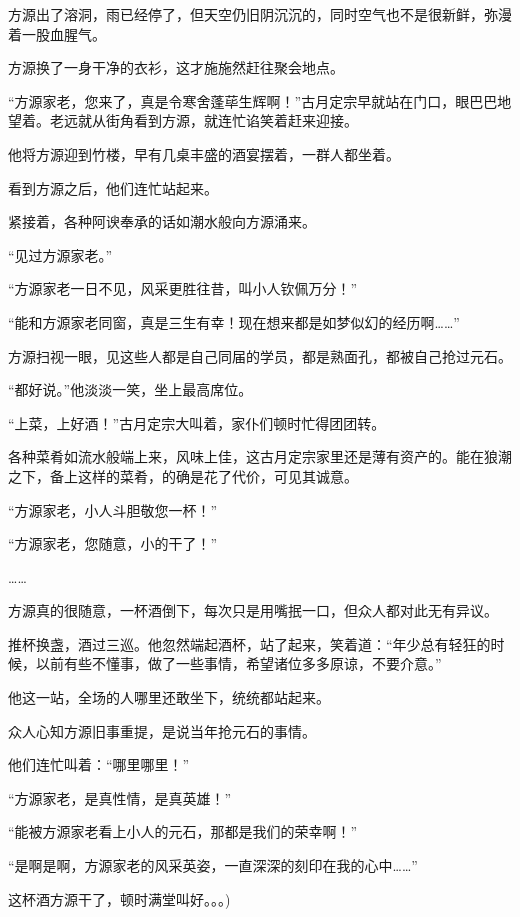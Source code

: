 \begin{this_body}
方源出了溶洞，雨已经停了，但天空仍旧阴沉沉的，同时空气也不是很新鲜，弥漫着一股血腥气。

方源换了一身干净的衣衫，这才施施然赶往聚会地点。

“方源家老，您来了，真是令寒舍蓬荜生辉啊！”古月定宗早就站在门口，眼巴巴地望着。老远就从街角看到方源，就连忙谄笑着赶来迎接。

他将方源迎到竹楼，早有几桌丰盛的酒宴摆着，一群人都坐着。

看到方源之后，他们连忙站起来。

紧接着，各种阿谀奉承的话如潮水般向方源涌来。

“见过方源家老。”

“方源家老一日不见，风采更胜往昔，叫小人钦佩万分！”

“能和方源家老同窗，真是三生有幸！现在想来都是如梦似幻的经历啊……”

方源扫视一眼，见这些人都是自己同届的学员，都是熟面孔，都被自己抢过元石。

“都好说。”他淡淡一笑，坐上最高席位。

“上菜，上好酒！”古月定宗大叫着，家仆们顿时忙得团团转。

各种菜肴如流水般端上来，风味上佳，这古月定宗家里还是薄有资产的。能在狼潮之下，备上这样的菜肴，的确是花了代价，可见其诚意。

“方源家老，小人斗胆敬您一杯！”

“方源家老，您随意，小的干了！”

……

方源真的很随意，一杯酒倒下，每次只是用嘴抿一口，但众人都对此无有异议。

推杯换盏，酒过三巡。他忽然端起酒杯，站了起来，笑着道：“年少总有轻狂的时候，以前有些不懂事，做了一些事情，希望诸位多多原谅，不要介意。”

他这一站，全场的人哪里还敢坐下，统统都站起来。

众人心知方源旧事重提，是说当年抢元石的事情。

他们连忙叫着：“哪里哪里！”

“方源家老，是真性情，是真英雄！”

“能被方源家老看上小人的元石，那都是我们的荣幸啊！”

“是啊是啊，方源家老的风采英姿，一直深深的刻印在我的心中……”

这杯酒方源干了，顿时满堂叫好。。。)

\end{this_body}

